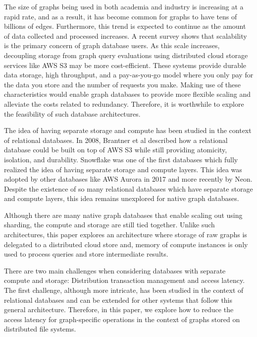 The size of graphs being used in both academia and industry is increasing at a
rapid rate, and as a result, it has become common for graphs to have tens of
billions of edges\cite{sahu2017ubiquity}. Furthermore, this trend is expected to
continue as the amount of data collected and processed increases. A recent
survey shows that scalability is the primary concern of graph database
users\cite{sahu2017ubiquity}. As this scale
increases, decoupling storage from graph query evaluations using distributed
cloud storage services like AWS S3\cite{awsS3} may be
more cost-efficient. These systems provide durable data storage, high
throughput, and a pay-as-you-go model where you only pay for the data you store
and the number of requests you make. Making use of these characteristics would
enable graph databases to provide more flexible scaling and alleviate 
the costs related to redundancy. Therefore, it is worthwhile to explore
the feasibility of such database architectures.

\medskip
The idea of having separate storage and compute has been studied in the context
of relational databases. In 2008, Brantner et al\cite{brantner2008building}
described how a relational database could be built on top of AWS S3 while still
providing atomicity, isolation, and durability. Snowflake\cite{snowflake} was
one of the first databases which fully realized the idea of having
separate storage and compute layers. This idea was adopted by other databases
like AWS Aurora\cite{verbitski2017amazon} in 2017 and more recently by
Neon\cite{neonPostgres}. Despite the existence of so many relational databases
which have separate storage and compute layers, this idea remains unexplored for
native graph databases.

\medskip
Although there are many native graph databases that enable scaling out
using sharding\cite{besta2023demystifying}, the compute and storage are
still tied together. Unlike such architectures, this paper explores an
architecture where storage of raw graphs is delegated to a distributed cloud
store and, memory of compute instances is only used to process queries and store
intermediate results.

\medskip
There are two main challenges when considering databases with separate compute
and storage: Distribution transaction management and access latency. The first
challenge, although more intricate, has been studied in the context of
relational databases\cite{brantner2008building} and can be extended for other
systems that follow this general architecture. Therefore, in this paper, we
explore how to reduce the access latency for graph-specific operations in
the context of graphs stored on distributed file systems.

